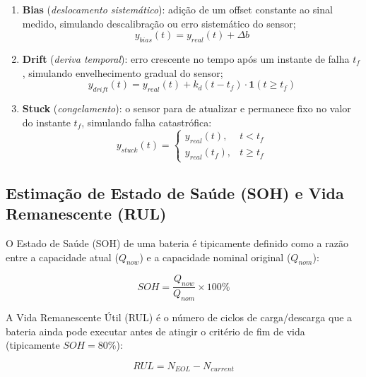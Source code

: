 \documentclass[
    12pt,
    openright,
    twoside,
    a4paper,
    brazil,
    english
]{abntex2}
\begin{document}
\begin{enumerate}
  \item \textbf{Bias} (\textit{deslocamento sistemático}): adição de um offset
        constante ao sinal medido, simulando descalibração ou erro sistemático
        do sensor;
        \begin{equation}
          y_{bias}(t) = y_{real}(t) + \Delta b
        \end{equation}
  \item \textbf{Drift} (\textit{deriva temporal}): erro crescente no tempo após
        um instante de falha $t_f$, simulando envelhecimento gradual do sensor;
        \begin{equation}
          y_{drift}(t) = y_{real}(t) + k_d(t - t_f)\cdot\mathbf{1}(t \geq t_f)
        \end{equation}
  \item \textbf{Stuck} (\textit{congelamento}): o sensor para de atualizar e
        permanece fixo no valor do instante $t_f$, simulando falha catastrófica:
        \begin{equation}
          y_{stuck}(t) = \begin{cases}
            y_{real}(t), & t < t_f \\
            y_{real}(t_f), & t \geq t_f
          \end{cases}
        \end{equation}
\end{enumerate}

\subsection{Estimação de Estado de Saúde (SOH) e Vida Remanescente (RUL)}

O Estado de Saúde (SOH) de uma bateria é tipicamente definido como a razão
entre a capacidade atual ($Q_{now}$) e a capacidade nominal original ($Q_{nom}$):

\begin{equation}
  SOH = \frac{Q_{now}}{Q_{nom}} \times 100\%
\end{equation}

A Vida Remanescente Útil (RUL) é o número de ciclos de carga/descarga que a
bateria ainda pode executar antes de atingir o critério de fim de vida (tipicamente
$SOH = 80\%$):

\begin{equation}
  RUL = N_{EOL} - N_{current}
\end{equation}
\end{document}
